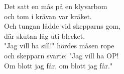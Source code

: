 \begin{vers}
Det satt en mås på en klyvarbom \\
och tom i krävan var kräket. \\
Och tungan lådde vid skepparns gom,\\ 
där skutan låg uti blecket. \\
"Jag vill ha sill!" hördes måsen rope \\
och skepparn svarte: "Jag vill ha OP! \\
Om blott jag får, om blott jag får." \\
\end{vers}